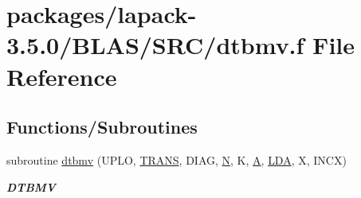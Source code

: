 \hypertarget{lapack-3_85_80_2BLAS_2SRC_2dtbmv_8f}{}\section{packages/lapack-\/3.5.0/\+B\+L\+A\+S/\+S\+R\+C/dtbmv.f File Reference}
\label{lapack-3_85_80_2BLAS_2SRC_2dtbmv_8f}
\subsection*{Functions/\+Subroutines}
\begin{DoxyCompactItemize}
\item 
subroutine \hyperlink{group__double__blas__level2_ga9f64da9e0125c712672fd89d166d3b9c}{dtbmv} (U\+P\+L\+O, \hyperlink{superlu__enum__consts_8h_a0c4e17b2d5cea33f9991ccc6a6678d62a1f61e3015bfe0f0c2c3fda4c5a0cdf58}{T\+R\+A\+N\+S}, D\+I\+A\+G, \hyperlink{polmisc_8c_a0240ac851181b84ac374872dc5434ee4}{N}, K, \hyperlink{classA}{A}, \hyperlink{example__user_8c_ae946da542ce0db94dced19b2ecefd1aa}{L\+D\+A}, X, I\+N\+C\+X)
\begin{DoxyCompactList}\small\item\em {\bfseries D\+T\+B\+M\+V} \end{DoxyCompactList}\end{DoxyCompactItemize}
